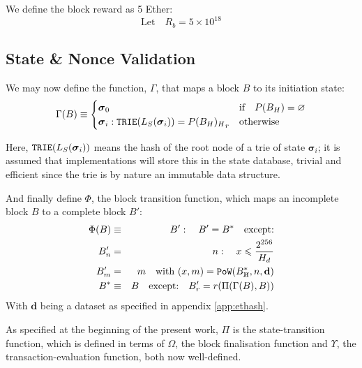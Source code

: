 \documentclass[9pt,oneside]{amsart}
\newcommand{\hcancel}[1]{%
    \tikz[baseline=(tocancel.base)]{
        \node[inner sep=0pt,outer sep=0pt] (tocancel) {#1};
        \draw[black] (tocancel.south west) -- (tocancel.north east);
    }%
}%
\begin{document}
\begin{multicols}{2}
We define the block reward as 5 Ether:
\begin{equation}
\text{Let} \quad R_b = 5 \times 10^{18}
\end{equation}

\subsection{State \& Nonce Validation}\label{sec:statenoncevalidation}

We may now define the function, $\Gamma$, that maps a block $B$ to its initiation state:
\begin{equation}
\Gamma(B) \equiv \begin{cases}
\boldsymbol{\sigma}_0 & \text{if} \quad P(B_H) = \varnothing \\
\boldsymbol{\sigma}_i: \mathtt{\small TRIE}(L_S(\boldsymbol{\sigma}_i)) = {P(B_H)_H}_r & \text{otherwise}
\end{cases}
\end{equation}

Here, $\mathtt{\small TRIE}(L_S(\boldsymbol{\sigma}_i))$ means the hash of the root node of a trie of state $\boldsymbol{\sigma}_i$; it is assumed that implementations will store this in the state database, trivial and efficient since the trie is by nature an immutable data structure.

And finally define $\Phi$, the block transition function, which maps an incomplete block $B$ to a complete block $B'$:
\begin{eqnarray}
\Phi(B) & \equiv & B': \quad B' = B^* \quad \text{except:} \\
B'_n & = & n: \quad x \leqslant \frac{2^{256}}{H_d} \\
B'_m & = & m \quad \text{with } (x, m) = \mathtt{PoW}(B^*_{\hcancel{n}}, n, \mathbf{d}) \\
B^* & \equiv & B \quad \text{except:} \quad B'_r = r(\Pi(\Gamma(B), B))
\end{eqnarray}
With $\mathbf{d}$ being a dataset as specified in appendix \ref{app:ethash}.

As specified at the beginning of the present work, $\Pi$ is the state-transition function, which is defined in terms of $\Omega$, the block finalisation function and $\Upsilon$, the transaction-evaluation function, both now well-defined.


\end{multicols}
\end{document}
